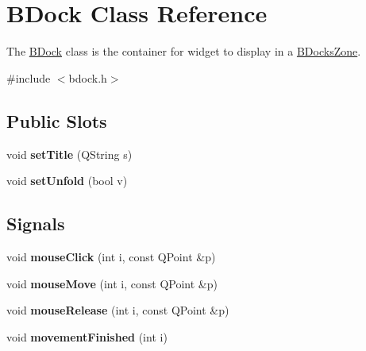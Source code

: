 \hypertarget{class_b_dock}{\section{\-B\-Dock \-Class \-Reference}
\label{class_b_dock}
}


\-The \hyperlink{class_b_dock}{\-B\-Dock} class is the container for widget to display in a \hyperlink{class_b_docks_zone}{\-B\-Docks\-Zone}.  




{\ttfamily \#include $<$bdock.\-h$>$}

\subsection*{\-Public \-Slots}
\begin{DoxyCompactItemize}
\item 
\hypertarget{class_b_dock_ad0552b2b035ddefbb08d0e43ff2a74d6}{void {\bfseries set\-Title} (\-Q\-String s)}\label{class_b_dock_ad0552b2b035ddefbb08d0e43ff2a74d6}

\item 
\hypertarget{class_b_dock_add467fabf0709c858a032113ec2ede80}{void {\bfseries set\-Unfold} (bool v)}\label{class_b_dock_add467fabf0709c858a032113ec2ede80}

\end{DoxyCompactItemize}
\subsection*{\-Signals}
\begin{DoxyCompactItemize}
\item 
\hypertarget{class_b_dock_a97c27119705ba63f80fa827c63a13b32}{void {\bfseries mouse\-Click} (int i, const \-Q\-Point \&p)}\label{class_b_dock_a97c27119705ba63f80fa827c63a13b32}

\item 
\hypertarget{class_b_dock_aafc27b012eaf8d3ef6a9d10df8406a60}{void {\bfseries mouse\-Move} (int i, const \-Q\-Point \&p)}\label{class_b_dock_aafc27b012eaf8d3ef6a9d10df8406a60}

\item 
\hypertarget{class_b_dock_ac0fccef29dee1c2d7e89567565671d22}{void {\bfseries mouse\-Release} (int i, const \-Q\-Point \&p)}\label{class_b_dock_ac0fccef29dee1c2d7e89567565671d22}

\item 
\hypertarget{class_b_dock_a8d5b322b2ac26b94a378636a1fc81ff1}{void {\bfseries movement\-Finished} (int i)}\label{class_b_dock_a8d5b322b2ac26b94a378636a1fc81ff1}

\end{DoxyCompactItemize}
